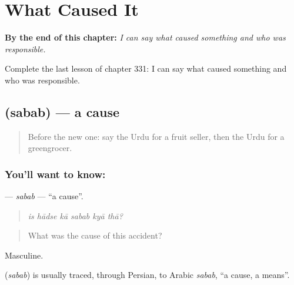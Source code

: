 
\chapter{What Caused It}
\label{ch:ur-what-caused-it}

\begin{chapteropening}
\textbf{By the end of this chapter:} \emph{I can say what caused something and who was responsible.}

Complete the last lesson of chapter 331: I can say what caused something and who was responsible.
\end{chapteropening}

\section[\texorpdfstring{\ur{سبب} (sabab)}{سبب (sabab)}]{ (sabab) — a cause}

\label{lesson:UR-C331-sabab}



\begin{quote}
Before the new one: say the Urdu for a fruit seller, then the Urdu for a greengrocer.
\end{quote}

\subsection*{You'll want to know: }
\textbf{} — \emph{sabab} — \textquotedblleft{}a cause\textquotedblright{}.

\begin{quote}
     
\end{quote}

\begin{quote}
\emph{is hādse kā sabab kyā thā?}
\end{quote}

\begin{quote}
What was the cause of this accident?
\end{quote}

Masculine.

\begin{cousinweb}
\textbf{} (\emph{sabab}) is usually traced, through Persian, to Arabic \emph{sabab}, \textquotedblleft{}a cause, a means\textquotedblright{}.
\end{cousinweb}

